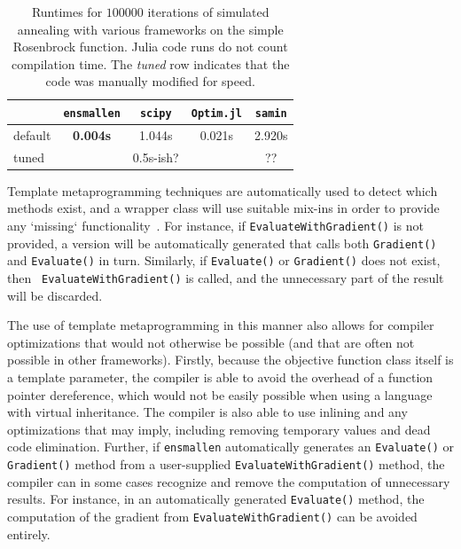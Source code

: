 \documentclass{article}
\begin{document}
\begin{table}[t]
\begin{center}
\begin{tabular}{lcccc}
\toprule
 & {\tt ensmallen} & {\tt scipy} & {\tt Optim.jl} & {\tt samin} \\
\midrule
default & {\bf 0.004s} & 1.044s & 0.021s & 2.920s \\
tuned & & 0.5s-ish? & & ?? \\ %
\bottomrule
\end{tabular}
\end{center}
\caption{Runtimes for $100000$ iterations of simulated annealing with various
frameworks on the simple Rosenbrock function.  Julia code runs do not count
compilation time.  The {\it tuned} row indicates that the code was manually
modified for speed.}
\label{tab:rosenbrock_results}
\end{table}

Template metaprogramming techniques are automatically used to
detect which methods exist, and a wrapper class will use suitable mix-ins in
order to provide any `missing` functionality~\cite{smaragdakis2000mixin}.  For
instance, if \texttt{\small EvaluateWithGradient()} is not provided, a version will be
automatically generated that calls both \texttt{\small Gradient()} and \texttt{\small Evaluate()} in turn.
Similarly, if \texttt{\small Evaluate()} or \texttt{\small Gradient()} does not exist, then {\tt
EvaluateWithGradient()} is called, and the unnecessary part of the result will
be discarded.

The use of template metaprogramming in this manner also allows for compiler optimizations that
would not otherwise be possible (and that are often not possible in other
frameworks).  Firstly, because the objective function class itself is a template
parameter, the compiler is able to avoid the overhead of a function pointer
dereference, which would not be easily possible when using a language with
virtual inheritance.  The compiler is also able to use inlining and any
optimizations that may imply, including removing temporary values and dead code
elimination.  Further, if {\tt ensmallen} automatically generates an
\texttt{\small Evaluate()} or \texttt{\small Gradient()} method from a user-supplied
\texttt{\small EvaluateWithGradient()} method, the compiler can in some cases recognize and
remove the computation of unnecessary results.  For instance, in an
automatically generated \texttt{\small Evaluate()} method, the computation of the gradient
from \texttt{\small EvaluateWithGradient()} can be avoided entirely.
\end{document}
